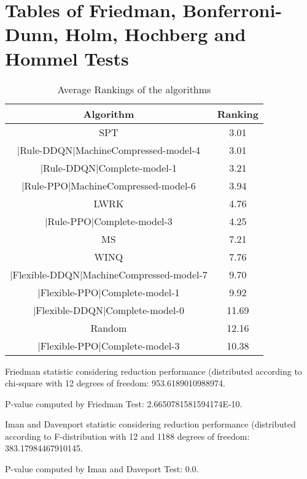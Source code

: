 \documentclass[a3paper,10pt]{article}
\author{}
\date{\today}
\begin{document}
\oddsidemargin 0in \topmargin 0in\maketitle
\section{Tables of Friedman, Bonferroni-Dunn, Holm, Hochberg and Hommel Tests}
\begin{table}[!htp]
\centering
\caption{Average Rankings of the algorithms
}\begin{tabular}{c|c}
Algorithm&Ranking\\
\hline
SPT&3.01\\
|Rule-DDQN|MachineCompressed-model-4&3.01\\
|Rule-DDQN|Complete-model-1&3.21\\
|Rule-PPO|MachineCompressed-model-6&3.94\\
LWRK&4.76\\
|Rule-PPO|Complete-model-3&4.25\\
MS&7.21\\
WINQ&7.76\\
|Flexible-DDQN|MachineCompressed-model-7&9.70\\
|Flexible-PPO|Complete-model-1&9.92\\
|Flexible-DDQN|Complete-model-0&11.69\\
Random&12.16\\
|Flexible-PPO|Complete-model-3&10.38\\
\end{tabular}
\end{table}


Friedman statistic considering reduction performance (distributed according to chi-square with 12 degrees of freedom: 953.6189010988974.


P-value computed by Friedman Test: 2.6650781581594174E-10.\newline

Iman and Davenport statistic considering reduction performance (distributed according to F-distribution with 12 and 1188 degrees of freedom: 383.17984467910145.


P-value computed by Iman and Daveport Test: 0.0.\newline
\end{document}
